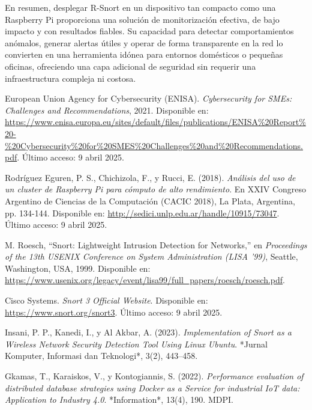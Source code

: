 \documentclass[12pt,a4paper]{report}
\begin{document}
En resumen, desplegar R-Snort en un dispositivo tan compacto como una Raspberry Pi proporciona una solución de monitorización efectiva, de bajo impacto y con resultados fiables. Su capacidad para detectar comportamientos anómalos, generar alertas útiles y operar de forma transparente en la red lo convierten en una herramienta idónea para entornos domésticos o pequeñas oficinas, ofreciendo una capa adicional de seguridad sin requerir una infraestructura compleja ni costosa.


\begin{thebibliography}{29}
	
	European Union Agency for Cybersecurity (ENISA). \textit{Cybersecurity for SMEs: Challenges and Recommendations}, 2021. Disponible en: \url{https://www.enisa.europa.eu/sites/default/files/publications/ENISA%20Report%20-%20Cybersecurity%20for%20SMES%20Challenges%20and%20Recommendations.pdf}. Último acceso: 9 abril 2025.
	
	Rodríguez Eguren, P. S., Chichizola, F., y Rucci, E. (2018). \textit{Análisis del uso de un cluster de Raspberry Pi para cómputo de alto rendimiento}. En XXIV Congreso Argentino de Ciencias de la Computación (CACIC 2018), La Plata, Argentina, pp. 134-144. Disponible en: \url{http://sedici.unlp.edu.ar/handle/10915/73047}. Último acceso: 9 abril 2025.
	
	M. Roesch, ``Snort: Lightweight Intrusion Detection for Networks,'' en \textit{Proceedings of the 13th USENIX Conference on System Administration (LISA '99)}, Seattle, Washington, USA, 1999. Disponible en: \url{https://www.usenix.org/legacy/event/lisa99/full_papers/roesch/roesch.pdf}.
	
	Cisco Systems. \textit{Snort 3 Official Website}. Disponible en: \url{https://www.snort.org/snort3}. Último acceso: 9 abril 2025.
	
	Insani, P. P., Kanedi, I., y Al Akbar, A. (2023). \textit{Implementation of Snort as a Wireless Network Security Detection Tool Using Linux Ubuntu}. *Jurnal Komputer, Informasi dan Teknologi*, 3(2), 443--458.
	
	Gkamas, T., Karaiskos, V., y Kontogiannis, S. (2022). \textit{Performance evaluation of distributed database strategies using Docker as a Service for industrial IoT data: Application to Industry 4.0}. *Information*, 13(4), 190. MDPI.
	

\end{thebibliography}
\end{document}
